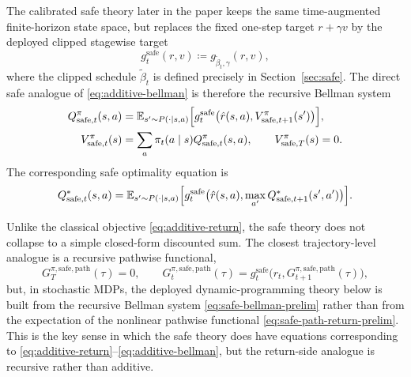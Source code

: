 \documentclass{article}
\theoremstyle{remark}
\newcommand{\E}{\mathbb{E}}
\newcommand{\defeq}{\coloneqq}
\newcommand{\safe}{\mathrm{safe}}
\begin{document}
The calibrated safe theory later in the paper keeps the same time-augmented finite-horizon state space, but replaces the fixed one-step target $r+\gamma v$ by the deployed clipped stagewise target
\[
g_t^{\safe}(r,v) \defeq g_{\widetilde\beta_t,\gamma}(r,v),
\]
where the clipped schedule $\widetilde\beta_t$ is defined precisely in Section~\ref{sec:safe}.
The direct safe analogue of \eqref{eq:additive-bellman} is therefore the recursive Bellman system
\begin{align}
Q^{\pi}_{\safe,t}(s,a)
&=
\E_{s'\sim P(\cdot\mid s,a)}\Bigl[g_t^{\safe}\bigl(\hat r(s,a),V^{\pi}_{\safe,t+1}(s')\bigr)\Bigr],
\nonumber\\
V^{\pi}_{\safe,t}(s)
&=
\sum_a \pi_t(a\mid s)Q^{\pi}_{\safe,t}(s,a),
\qquad
V^{\pi}_{\safe,T}(s)=0.
\label{eq:safe-bellman-prelim}
\end{align}
The corresponding safe optimality equation is
\[
Q^{*}_{\safe,t}(s,a)
=
\E_{s'\sim P(\cdot\mid s,a)}\Bigl[g_t^{\safe}\bigl(\hat r(s,a),\max_{a'}Q^{*}_{\safe,t+1}(s',a')\bigr)\Bigr].
\]

Unlike the classical objective \eqref{eq:additive-return}, the safe theory does not collapse to a simple closed-form discounted sum.
The closest trajectory-level analogue is a recursive pathwise functional,
\begin{equation}
G_{T}^{\pi,\safe,\mathrm{path}}(\tau)=0,
\qquad
G_{t}^{\pi,\safe,\mathrm{path}}(\tau)=g_t^{\safe}\bigl(r_t,G_{t+1}^{\pi,\safe,\mathrm{path}}(\tau)\bigr),
\label{eq:safe-path-return-prelim}
\end{equation}
but, in stochastic MDPs, the deployed dynamic-programming theory below is built from the recursive Bellman system \eqref{eq:safe-bellman-prelim} rather than from the expectation of the nonlinear pathwise functional \eqref{eq:safe-path-return-prelim}.
This is the key sense in which the safe theory does have equations corresponding to \eqref{eq:additive-return}--\eqref{eq:additive-bellman}, but the return-side analogue is recursive rather than additive.
\end{document}
